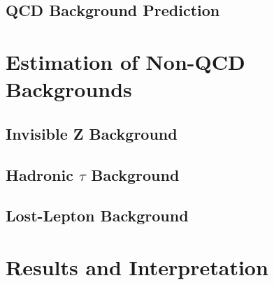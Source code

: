 \subsection{QCD Background Prediction}
\label{subsec:RA2_qcd_pred}

\section{Estimation of Non-QCD Backgrounds}
\label{sec:RA2_Non-QCD}

\subsection{Invisible Z Background}
\label{subsec:RA2_Zinv}

\subsection{Hadronic $\tau$ Background}
\label{subsec:RA2_tauhad}

\subsection{Lost-Lepton Background}
\label{subsec:RA2_lostlepton}

\section{Results and Interpretation}
\label{sec:RA2_results}


